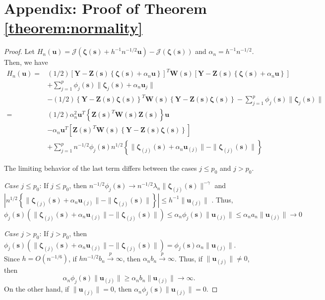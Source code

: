 \documentclass[authoryear,review, 12pt]{elsarticle}
\begin{document}
\section*{Appendix: Proof of Theorem \ref{theorem:normality}\label{sec:gaussian-normality-proof} }
\begin{proof}
Let $H_{n}(\bm{u})=\mathcal{J}\left(\bm{\zeta}(\bm{s})+h^{-1}n^{-1/2}\bm{u}\right)-\mathcal{J}\left(\bm{\zeta}(\bm{s})\right)$
and $\alpha_{n}=h^{-1}n^{-1/2}$. Then, we have 
\begin{align*}
H_{n}(\bm{u})= & (1/2)\left[\bm{Y}-\bm{Z}(\bm{s})\left\{ \bm{\zeta}(\bm{s})+\alpha_{n}\bm{u}\right\} \right]^{T}\bm{W}\!(\bm{s})\left[\bm{Y}-\bm{Z}(\bm{s})\left\{ \bm{\zeta}(\bm{s})+\alpha_{n}\bm{u}\right\} \right]\\
 & +\sum_{j=1}^{p}\phi_{j}(\bm{s})\|\bm{\zeta}_{j}(\bm{s})+\alpha_{n}\bm{u}_{j}\|\\
 & -(1/2)\left\{ \bm{Y}-\bm{Z}(\bm{s})\bm{\zeta}(\bm{s})\right\} ^{T}\bm{W}\!(\bm{s})\left\{ \bm{Y}-\bm{Z}(\bm{s})\bm{\zeta}(\bm{s})\right\} -\sum_{j=1}^{p}\phi_{j}(\bm{s})\|\bm{\zeta}_{j}(\bm{s})\|\\
= & \left(1/2\right)\alpha_{n}^{2}\bm{u}^{T}\left\{ \bm{Z}(\bm{s})^{T}\bm{W}\!(\bm{s})\bm{Z}(\bm{s})\right\} \bm{u}\\
 & -\alpha_{n}\bm{u}^{T}\left[\bm{Z}(\bm{s})^{T}\bm{W}\!(\bm{s})\left\{ \bm{Y}-\bm{Z}(\bm{s})\bm{\zeta}(\bm{s})\right\} \right]\\
 & +\sum_{j=1}^{p}n^{-1/2}\phi_{j}(\bm{s})n^{1/2}\left\{ \|\bm{\zeta}_{(j)}(\bm{s})+\alpha_{n}\bm{u}_{(j)}\|-\|\bm{\zeta}_{(j)}(\bm{s})\|\right\} 
\end{align*}


The limiting behavior of the last term differs between the cases $j\le p_{0}$
and $j>p_{0}$.

\emph{Case $j\le p_{0}$}: If $j\le p_{0}$, then $n^{-1/2}\phi_{j}(\bm{s})\to n^{-1/2}\lambda_{n}\|\bm{\zeta}_{(j)}(\bm{s})\|^{-\gamma}$
and $|n^{1/2}\left\{ \|\bm{\zeta}_{(j)}(\bm{s})+\alpha_{n}\bm{u}_{(j)}\|-\|\bm{\zeta}_{(j)}(\bm{s})\|\right\} |\le h^{-1}\|\bm{u}_{(j)}\|$
. Thus, 
\[
\phi_{j}(\bm{s})\left(\|\bm{\zeta}_{(j)}(\bm{s})+\alpha_{n}\bm{u}_{(j)}\|-\|\bm{\zeta}_{(j)}(\bm{s})\|\right)\le\alpha_{n}\phi_{j}(\bm{s})\|\bm{u}_{(j)}\|\le\alpha_{n}a_{n}\|\bm{u}_{(j)}\|\to0
\]


\emph{Case $j>p_{0}$}: If $j>p_{0}$, then $\phi_{j}(\bm{s})\left(\|\bm{\zeta}_{(j)}(\bm{s})+\alpha_{n}\bm{u}_{(j)}\|-\|\bm{\zeta}_{(j)}(\bm{s})\|\right)=\phi_{j}(\bm{s})\alpha_{n}\|\bm{u}_{(j)}\|$.
Since $h=O(n^{-1/6})$, if $hn^{-1/2}b_{n}\xrightarrow{p}\infty$,
then $\alpha_{n}b_{n}\xrightarrow{p}\infty$. Thus, if $\|\bm{u}_{(j)}\|\ne0$,
then 
\[
\alpha_{n}\phi_{j}(\bm{s})\|\bm{u}_{(j)}\|\ge\alpha_{n}b_{n}\|\bm{u}_{(j)}\|\to\infty.
\]
On the other hand, if $\|\bm{u}_{(j)}\|=0$, then $\alpha_{n}\phi_{j}(\bm{s})\|\bm{u}_{(j)}\|=0$.


\end{proof}
\end{document}
